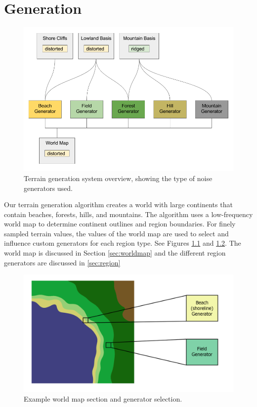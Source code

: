 
\chapter{Generation} \label{generation}

\begin{figure}
	\centering
		\includegraphics[width=1.0\textwidth]{figures/generation_flowchart.png}
	\caption{Terrain generation system overview, showing the type of noise generators used.}
	\label{fig:gen_overview}
\end{figure}

Our terrain generation algorithm creates a world with large continents that contain beaches, forests, hills, and mountains.
The algorithm uses a low-frequency world map to determine continent outlines and region boundaries.
For finely sampled terrain values, the values of the world map are used to select and influence custom generators for each region type.
See Figures \ref{fig:gen_overview} and \ref{fig:worldmap}.
The world map is discussed in Section \ref{sec:worldmap} and the different region generators are discussed in \ref{sec:region}

\begin{figure}
	\centering
		\includegraphics[width=1.0\textwidth]{figures/worldmap.png}
	\caption{Example world map section and generator selection.}
	\label{fig:worldmap}
\end{figure}

